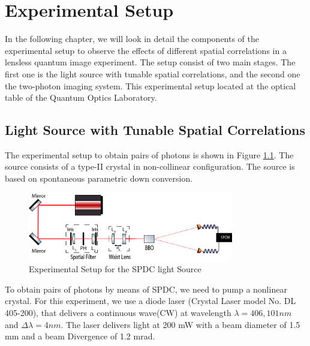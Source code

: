 
\chapter{Experimental Setup} %

\label{Chapter3} %
In the following chapter, we will look in detail the components of the experimental 
setup to observe the effects of different spatial correlations in a lensless quantum image
experiment. The setup consist of two  main stages. The first one is the light source 
with tunable spatial correlations, and the second one the two-photon imaging system. 
This experimental setup located at the optical table of the 
Quantum Optics Laboratory.
\section{Light Source with Tunable Spatial Correlations}

The experimental setup to obtain pairs of photons is shown in Figure \ref{fig:SPDC}. 
The source consists of a type-II crystal in  non-collinear configuration. The source is based
on spontaneous parametric down conversion.


\begin{figure}[h!]
\centering
\includegraphics[width=0.8\textwidth]{Figures/SPDC.png}
\caption{Experimental Setup for the SPDC light Source} 
\label{fig:SPDC}
\end{figure}


To obtain pairs of photons by means of SPDC, we need to pump a nonlinear crystal.
For this experiment, we use a diode laser (Crystal Laser model No. DL 405-200),  
that delivers a continuous wave(CW) at wavelength $\lambda = 406,101 nm$ and $\Delta \lambda = 4 nm$. 
The laser delivers light at 200 mW with a beam diameter 
of 1.5 mm and a beam Divergence of 1.2 mrad.






